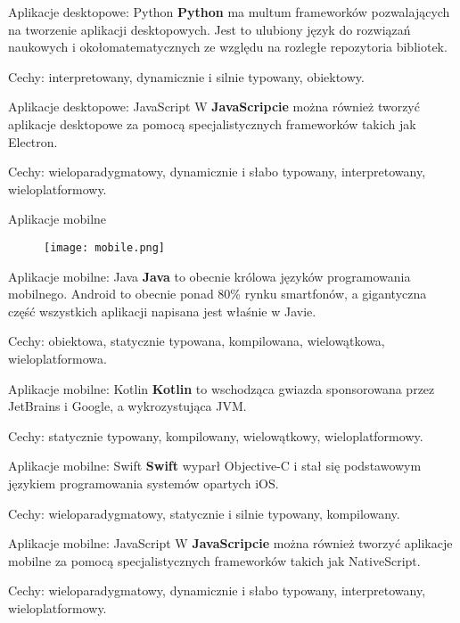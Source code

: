 \begin{frame}{Aplikacje desktopowe: Python}		
	\textbf{Python} ma multum frameworków pozwalających na tworzenie aplikacji desktopowych. Jest to ulubiony język do rozwiązań naukowych i okołomatematycznych ze względu na rozległe repozytoria bibliotek.
	
	Cechy: interpretowany, dynamicznie i silnie typowany, obiektowy.
\end{frame}

\begin{frame}{Aplikacje desktopowe: JavaScript}		
	W \textbf{JavaScripcie} można również tworzyć aplikacje desktopowe za pomocą specjalistycznych frameworków takich jak Electron.
	
	Cechy: wieloparadygmatowy, dynamicznie i słabo typowany, interpretowany, wieloplatformowy.
\end{frame}

\begin{frame}{Aplikacje mobilne}		
	\begin{figure}
		\centering
		\texttt{[image: mobile.png]}
	\end{figure}
\end{frame}

\begin{frame}{Aplikacje mobilne: Java}		
	\textbf{Java} to obecnie królowa języków programowania mobilnego. Android to obecnie ponad 80\% rynku smartfonów, a gigantyczna część wszystkich aplikacji napisana jest właśnie w Javie.
	
	Cechy: obiektowa, statycznie typowana, kompilowana, wielowątkowa, wieloplatformowa.
\end{frame}

\begin{frame}{Aplikacje mobilne: Kotlin}		
	\textbf{Kotlin} to wschodząca gwiazda sponsorowana przez JetBrains i Google, a wykrozystująca JVM. 
	
	Cechy: statycznie typowany, kompilowany, wielowątkowy, wieloplatformowy.
\end{frame}

\begin{frame}{Aplikacje mobilne: Swift}		
	\textbf{Swift} wyparł Objective-C i stał się podstawowym językiem programowania systemów opartych iOS.
	
	Cechy: wieloparadygmatowy, statycznie i silnie typowany, kompilowany.
\end{frame}

\begin{frame}{Aplikacje mobilne: JavaScript}		
	W \textbf{JavaScripcie} można również tworzyć aplikacje mobilne za pomocą specjalistycznych frameworków takich jak NativeScript.
	
	Cechy: wieloparadygmatowy, dynamicznie i słabo typowany, interpretowany, wieloplatformowy.
\end{frame}

